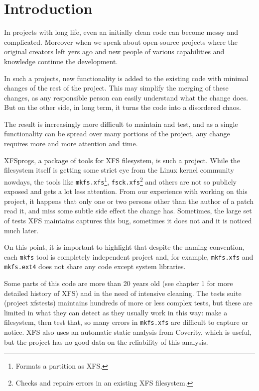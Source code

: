 
\chapter{Introduction}\label{chap:introduction}


In projects with long life, even an initially clean code can become messy and complicated. Moreover when we speak about open-source projects where the original creators left yers ago and new people of various capabilities and knowledge continue the development.

In such a projects, new functionality is added to the existing code with
minimal changes of the rest of the project. This may simplify the merging
of these changes, as any responsible person can easily understand what the
change does. But on the other side, in long term, it turns the code into
a disordered chaos.

The result is increasingly more difficult to maintain and test, and as a single functionality can be spread over many portions of the project, any change requires more and more attention and time.

XFSprogs, a package of tools for XFS filesystem, is such a project. While
the filesystem itself is getting some strict eye from the Linux kernel
community nowdays, the tools like {\tt mkfs.xfs}\footnote{Formats a
partition as XFS.}, {\tt fsck.xfs}\footnote{Checks and repairs errors in an
existing XFS filesystem.} and others are not so publicly exposed and gets a
lot less attention. From our experience with working on this project, it
happens that only one or two persons other than the author of a patch read
it, and miss some subtle side effect the change has. Sometimes, the large
set of tests XFS maintains captures this bug, sometimes it does not and it
is noticed much later.

On this point, it is important to highlight that despite the naming
convention, each {\tt mkfs} tool is completely independent project and, for
example, {\tt mkfs.xfs} and {\tt mkfs.ext4} does not share any code except
system libraries.

Some parts of this code are more than 20 years old (see chapter 1 for more detailed history of XFS) and in the need of intensive cleaning. The tests suite (project xfstests) maintains hundreds of more or less complex tests, but these are limited in what they can detect as they usually work in this way: make a filesystem, then test that, so many errors in {\tt mkfs.xfs} are difficult to capture or notice. XFS also uses an automatic static analysis from Coverity, which is useful, but the project has no good data on the reliability of this analysis.

